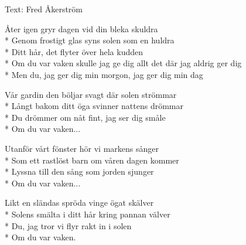 \begin{SongText}
    \begin{SongInfo}
        Text: Fred Åkerström
    \end{SongInfo}
    \begin{SongVerse}
        Åter igen gryr dagen vid din bleka skuldra\\*%
        Genom frostigt glas syns solen som en huldra\\*%
        Ditt hår, det flyter över hela kudden\\*%
        Om du var vaken skulle jag ge dig allt det där jag aldrig ger dig\\*%
        Men du, jag ger dig min morgon, jag ger dig min dag
    \end{SongVerse}
    \begin{SongVerse}
        Vår gardin den böljar svagt där solen strömmar\\*%
        Långt bakom ditt öga svinner nattens drömmar\\*%
        Du drömmer om nåt fint, jag ser dig småle\\*%
        Om du var vaken... 
    \end{SongVerse}
    \begin{SongVerse}
        Utanför vårt fönster hör vi markens sånger\\*%
        Som ett rastlöst barn om våren dagen kommer\\*%
        Lyssna till den sång som jorden sjunger\\*%
        Om du var vaken...
    \end{SongVerse}
    \begin{SongVerse}
        Likt en sländas spröda vinge ögat skälver\\*%
        Solens smälta i ditt hår kring pannan välver\\*%
        Du, jag tror vi flyr rakt in i solen\\*%
        Om du var vaken.
    \end{SongVerse}
\end{SongText}